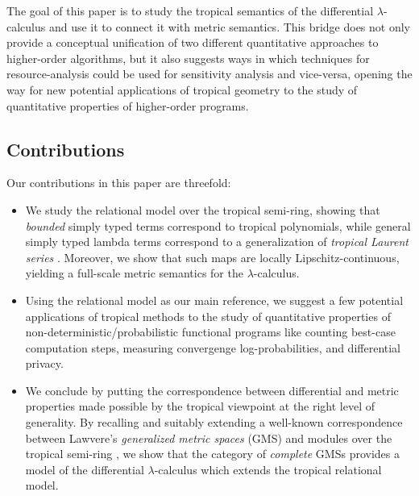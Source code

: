 The goal of this paper is to study the tropical semantics of the differential $\lambda$-calculus and use it to connect it with metric semantics. This bridge does not only provide a conceptual unification of two different quantitative approaches to higher-order algorithms, but it also 
suggests ways in which techniques for resource-analysis could be used for sensitivity analysis and vice-versa, opening the way for new potential applications of tropical geometry to the study of quantitative properties of higher-order programs.


\subsection{Contributions}

Our contributions in this paper are threefold:
\begin{itemize}

\item We study the relational model over the tropical semi-ring, showing that
\emph{bounded} simply typed terms correspond to tropical polynomials, while general
 simply typed lambda terms correspond to a generalization of \emph{tropical Laurent series} \cite{Porzio2021}. Moreover, we show that such maps are locally Lipschitz-continuous, yielding a full-scale metric semantics for the $\lambda$-calculus.


\item Using the relational model as our main reference, we suggest a few potential applications of tropical methods to the study of quantitative properties of non-deterministic/probabilistic functional programs like counting best-case computation steps, 
measuring convergenge log-probabilities, and 
differential privacy.

\item We conclude by putting the correspondence between differential and metric properties made possible by the tropical viewpoint at the right level of generality. 
By recalling and suitably extending a well-known correspondence between Lawvere's \emph{generalized metric spaces} (GMS) \cite{Lawvere1973, Stubbe2014} and modules over the tropical semi-ring \cite{Russo2007}, we show that the category of \emph{complete}  GMSs provides a model of the differential $\lambda$-calculus which extends the tropical relational model.
\end{itemize}

